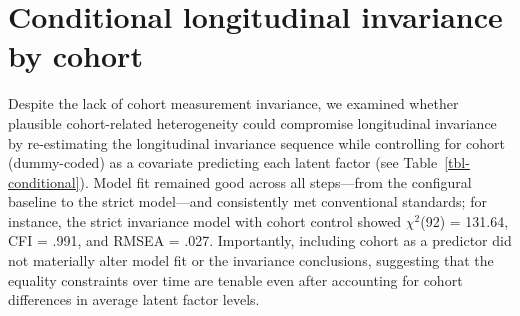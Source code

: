 \documentclass[
  12pt,
]{article}
\begin{document}
\begin{table}

\caption{\label{tbl-lavtestcohort}Sources of misfit in longitudinal
invariance}


\end{table}%

\newpage{}

\section{Conditional longitudinal invariance by
cohort}\label{conditional-longitudinal-invariance-by-cohort}

Despite the lack of cohort measurement invariance, we examined whether
plausible cohort-related heterogeneity could compromise longitudinal
invariance by re-estimating the longitudinal invariance sequence while
controlling for cohort (dummy-coded) as a covariate predicting each
latent factor (see Table~\ref{tbl-conditional}). Model fit remained good
across all steps---from the configural baseline to the strict
model---and consistently met conventional standards; for instance, the
strict invariance model with cohort control showed \(\chi^2\)(92) =
131.64, CFI = .991, and RMSEA = .027. Importantly, including cohort as a
predictor did not materially alter model fit or the invariance
conclusions, suggesting that the equality constraints over time are
tenable even after accounting for cohort differences in average latent
factor levels.
\end{document}
